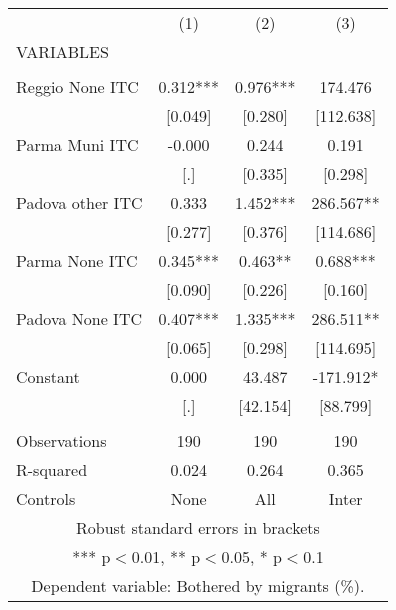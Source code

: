 \begin{tabular}{lccc} \hline
 & (1) & (2) & (3) \\
VARIABLES &  &  &  \\ \hline
 &  &  &  \\
Reggio None ITC & 0.312*** & 0.976*** & 174.476 \\
 & [0.049] & [0.280] & [112.638] \\
Parma Muni ITC & -0.000 & 0.244 & 0.191 \\
 & [.] & [0.335] & [0.298] \\
Padova other ITC & 0.333 & 1.452*** & 286.567** \\
 & [0.277] & [0.376] & [114.686] \\
Parma None ITC & 0.345*** & 0.463** & 0.688*** \\
 & [0.090] & [0.226] & [0.160] \\
Padova None ITC & 0.407*** & 1.335*** & 286.511** \\
 & [0.065] & [0.298] & [114.695] \\
Constant & 0.000 & 43.487 & -171.912* \\
 & [.] & [42.154] & [88.799] \\
 &  &  &  \\
Observations & 190 & 190 & 190 \\
R-squared & 0.024 & 0.264 & 0.365 \\
 Controls & None & All & Inter \\ \hline
\multicolumn{4}{c}{ Robust standard errors in brackets} \\
\multicolumn{4}{c}{ *** p$<$0.01, ** p$<$0.05, * p$<$0.1} \\
\multicolumn{4}{c}{ Dependent variable: Bothered by migrants (\%).} \\
\end{tabular}

